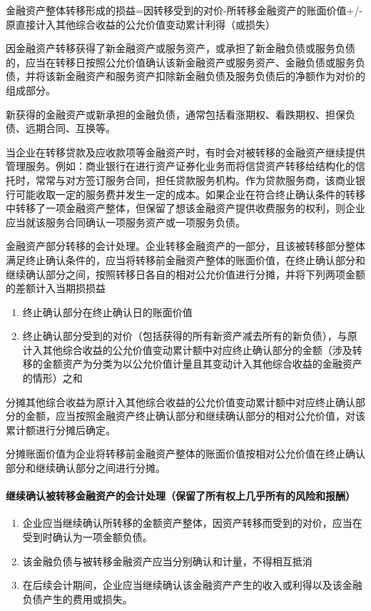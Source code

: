 \documentclass[UTF8,12pt]{ctexart}
\numberwithin{equation}{section} %
\numberwithin{figure}{section}
\numberwithin{table}{section}
\begin{document}
	金融资产整体转移形成的损益=因转移受到的对价-所转移金融资产的账面价值+/-原直接计入其他综合收益的公允价值变动累计利得（或损失）
	
	因金融资产转移获得了新金融资产或服务资产，或承担了新金融负债或服务负债的，应当在转移日按照公允价值确认该新金融资产或服务资产、金融负债或服务负债，并将该新金融资产和服务资产扣除新金融负债及服务负债后的净额作为对价的组成部分。
	
	新获得的金融资产或新承担的金融负债，通常包括看涨期权、看跌期权、担保负债、远期合同、互换等。
	
	当企业在转移贷款及应收款项等金融资产时，有时会对被转移的金融资产继续提供管理服务。例如：商业银行在进行资产证券化业务而将信贷资产转移给结构化的信托时，常常与对方签订服务合同，担任贷款服务机构。作为贷款服务商，该商业银行可能收取一定的服务费并发生一定的成本。如果企业在符合终止确认条件的转移中转移了一项金融资产整体，但保留了想该金融资产提供收费服务的权利，则企业应当就该服务合同确认一项服务资产或一项服务负债。
	
	金融资产部分转移的会计处理。企业转移金融资产的一部分，且该被转移部分整体满足终止确认条件的，应当将转移前金融资产整体的账面价值，在终止确认部分和继续确认部分之间，按照转移日各自的相对公允价值进行分摊，并将下列两项金额的差额计入当期损损益
	\begin{enumerate}
		\item 终止确认部分在终止确认日的账面价值
		
		\item 终止确认部分受到的对价（包括获得的所有新资产减去所有的新负债），与原计入其他综合收益的公允价值变动累计额中对应终止确认部分的金额（涉及转移的金额资产为分类为以公允价值计量且其变动计入其他综合收益的金融资产的情形）之和
	\end{enumerate}

	分摊其他综合收益为原计入其他综合收益的公允价值变动累计额中对应终止确认部分的金额，应当按照金融资产终止确认部分和继续确认部分的相对公允价值，对该累计额进行分摊后确定。
	
	分摊账面价值为企业将转移前金融资产整体的账面价值按相对公允价值在终止确认部分和继续确认部分之间进行分摊。
	
	\paragraph{继续确认被转移金融资产的会计处理（保留了所有权上几乎所有的风险和报酬）}
	\begin{enumerate}
		\item 企业应当继续确认所转移的金额资产整体，因资产转移而受到的对价，应当在受到时确认为一项金额负债。
		
		\item 该金融负债与被转移金融资产应当分别确认和计量，不得相互抵消
		
		\item 在后续会计期间，企业应当继续确认该金融资产产生的收入或利得以及该金融负债产生的费用或损失。
	\end{enumerate}
\end{document}
